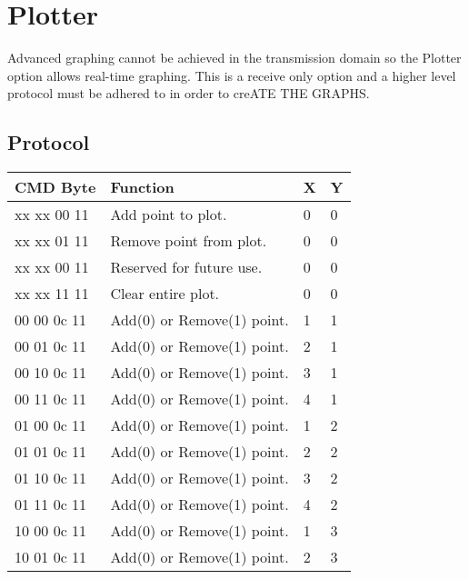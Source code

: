 \section{Plotter}


Advanced graphing cannot be achieved in the transmission domain so the \ds Plotter option allows real-time graphing.
This is a receive only option and a higher level protocol must be adhered to in order to creATE THE GRAPHS. 

\subsection{Protocol}

\begin{table}[h]
   \centering
    \begin{tabular}{ | p{3cm} | p{6cm}|p{1cm} | p{1cm}|}\hline
    \textbf{CMD Byte} 	& \textbf{Function} 					& \textbf{X} 					& \textbf{Y}	\\ \hline
    xx xx 00 11 			&	Add point to plot. 					& 0 							& 0 							\\ \hline
	xx xx 01 11 			&	Remove point from plot.	 			& 0 							& 0 							\\ \hline
	xx xx 00 11 			&	Reserved for future use.	 		& 0 							& 0 							\\ \hline
	xx xx 11 11 			&	Clear entire plot.			 		& 0 							& 0								\\ \hline
	00 00 0c 11 			&	Add(0) or Remove(1) point. 			& 1 							& 1								\\ \hline
	00 01 0c 11 			&	Add(0) or Remove(1) point. 			& 2 							& 1								\\ \hline
	00 10 0c 11 			&	Add(0) or Remove(1) point. 			& 3 							& 1								\\ \hline
	00 11 0c 11 			&	Add(0) or Remove(1) point. 			& 4 							& 1								\\ \hline
	01 00 0c 11 			&	Add(0) or Remove(1) point. 			& 1 							& 2								\\ \hline
	01 01 0c 11 			&	Add(0) or Remove(1) point. 			& 2 							& 2								\\ \hline
	01 10 0c 11 			&	Add(0) or Remove(1) point. 			& 3 							& 2								\\ \hline
	01 11 0c 11 			&	Add(0) or Remove(1) point. 			& 4 							& 2								\\ \hline
	10 00 0c 11 			&	Add(0) or Remove(1) point. 			& 1 							& 3								\\ \hline
	10 01 0c 11 			&	Add(0) or Remove(1) point. 			& 2 							& 3								\\ \hline

\end{tabular}
\end{table}
